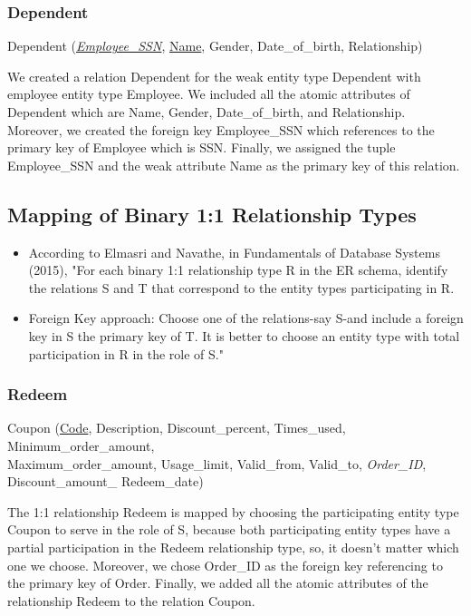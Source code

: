 \subsubsection{Dependent}

Dependent (\underline{\textit{Employee\_SSN}}, \underline{Name}, Gender, Date\_of\_birth, Relationship)

We created a relation Dependent for the weak entity type Dependent with employee entity type Employee. We included all the atomic attributes of Dependent which are Name, Gender, Date\_of\_birth, and Relationship. Moreover, we created the foreign key Employee\_SSN which references to the primary key of Employee which is SSN. Finally, we assigned the tuple Employee\_SSN and the weak attribute Name as the primary key of this relation.

\subsection{Mapping of Binary 1:1 Relationship Types}

\begin{itemize}
  \item According to Elmasri and Navathe, in Fundamentals of Database Systems (2015), "For each binary 1:1 relationship type R in the ER schema, identify the relations S and T that correspond to the entity types participating in R.
  \item Foreign Key approach: Choose one of the relations-say S-and include a foreign key in S the primary key of T. It is better to choose an entity type with total participation in R in the role of S." \cite{elmasri}
\end{itemize}

\subsubsection{Redeem}

Coupon (\underline{Code}, Description, Discount\_percent, Times\_used, Minimum\_order\_amount, \\
Maximum\_order\_amount, Usage\_limit, Valid\_from, Valid\_to, \textit{Order\_ID}, \\
Discount\_amount\_ Redeem\_date)

The 1:1 relationship Redeem is mapped by choosing the participating entity type Coupon to serve in the role of S, because both participating entity types have a partial participation in the Redeem relationship type, so, it doesn't matter which one we choose. Moreover, we chose Order\_ID as the foreign key referencing to the primary key of Order. Finally, we added all the atomic attributes of the relationship Redeem to the relation Coupon.

